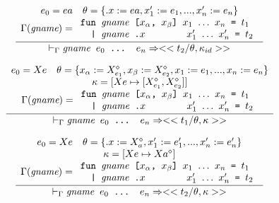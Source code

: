 \documentclass[10pt]{../sigplanconf}
\newcommand{\nfrac}[2]{\frac{\displaystyle{#1}}{\displaystyle{#2}}}
\begin{document}
\begin{figure}
  \begin{equation}
    \nfrac{
      \begin{array}{c}
        e_0 = ea \quad \theta = \{ .x := ea, x_1' := e_1, ..., x_n' := e_n \} \\
        \Gamma(\textit{gname}) =
        \begin{array}{l}
          \texttt{fun \textit{\rmfamily gname} [$x_\alpha$, $x_\beta$] $x_1$ $\ldots$ $x_n$ = $t_1$} \\
          \texttt{\ \ | \textit{\rmfamily gname}\ \texttt{.}$x$ \hspace{1.1cm} $x_1'$ $\ldots$ $x_n'$ = $t_2$} \\
        \end{array}
      \end{array}
    }{
      |-_\Gamma \texttt{\textit{\rmfamily gname} $e_0$ ... $e_n$} => <<t_2 / \theta, \kappa_{id}>>
    }
  \end{equation}

  \begin{equation}
    \nfrac{
      \begin{array}{c}
        e_0 = Xe \quad \theta = \{ x_\alpha := X_{e_1}^\diamond, x_\beta := X_{e_2}^\diamond, x_1 := e_1, ..., x_n := e_n \} \\
        \kappa = [Xe \mapsto [X_{e_1}^\diamond, X_{e_2}^\diamond]] \\
        \Gamma(\textit{gname}) =
        \begin{array}{l}
          \texttt{fun \textit{\rmfamily gname} [$x_\alpha$, $x_\beta$] $x_1$ $\ldots$ $x_n$ = $t_1$} \\
          \texttt{\ \ | \textit{\rmfamily gname}\ \texttt{.}$x$ \hspace{1.1cm} $x_1'$ $\ldots$ $x_n'$ = $t_2$} \\
        \end{array}
      \end{array}
    }{
      |-_\Gamma \texttt{\textit{\rmfamily gname} $e_0$ ... $e_n$} => <<t_1 / \theta, \kappa>>
    }
  \end{equation}

  \begin{equation}
    \nfrac{
      \begin{array}{c}
        e_0 = Xe \quad \theta = \{ .x := X_{a}^\diamond, x_1' := e_1', ..., x_n' := e_n' \} \\
        \kappa = [Xe \mapsto Xa^\diamond] \\
        \Gamma(\textit{gname}) =
        \begin{array}{l}
          \texttt{fun \textit{\rmfamily gname} [$x_\alpha$, $x_\beta$] $x_1$ $\ldots$ $x_n$ = $t_1$} \\
          \texttt{\ \ | \textit{\rmfamily gname}\ \texttt{.}$x$ \hspace{1.1cm} $x_1'$ $\ldots$ $x_n'$ = $t_2$} \\
        \end{array}
      \end{array}
    }{
      |-_\Gamma \texttt{\textit{\rmfamily gname} $e_0$ ... $e_n$} => <<t_2 / \theta, \kappa>>
    }
  \end{equation}


\end{figure}
\end{document}

